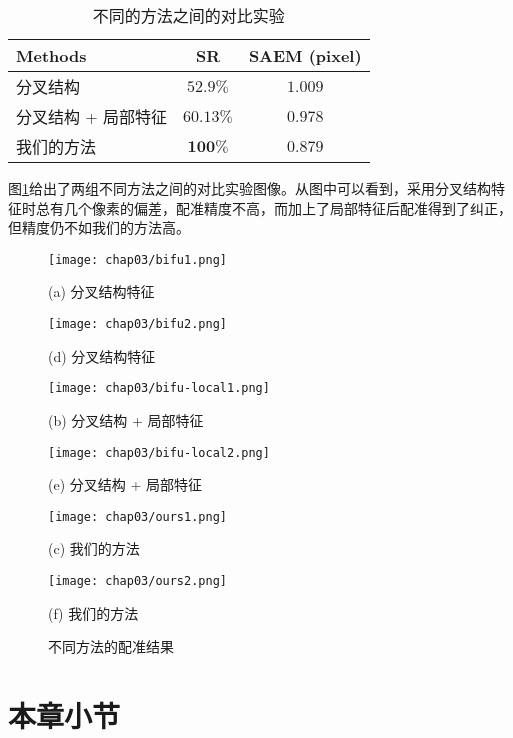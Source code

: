 \begin{table}[!ht]
\caption{不同的方法之间的对比实验}
\centering
\begin{tabular}{lcc}
\toprule
Methods & SR & SAEM (pixel)\\
\midrule
分叉结构 & $52.9\%$ & $1.009$\\
分叉结构 + 局部特征& $60.13\%$ & $0.978$\\
我们的方法 & $\mathbf{100\%}$ & $\mathbf{0.879}$\\
\bottomrule
\end{tabular}
\label{tab:methods}
\end{table}
图\ref{fig:methods-fig}给出了两组不同方法之间的对比实验图像。从图中可以看到，采用分叉结构特征时总有几个像素的偏差，配准精度不高，而加上了局部特征后配准得到了纠正，但精度仍不如我们的方法高。
\begin{figure}[!ht]
\centering
\begin{minipage}[b]{0.48\textwidth} 
      \centering 
      \texttt{[image: chap03/bifu1.png]}
        \centerline{(a) 分叉结构特征}\medskip
\end{minipage}
  \begin{minipage}[b]{0.48\textwidth}
    \centering
    \texttt{[image: chap03/bifu2.png]}
      \centerline{(d) 分叉结构特征}\medskip
  \end{minipage}
  \begin{minipage}[b]{0.48\textwidth}
    \centering
    \texttt{[image: chap03/bifu-local1.png]}
      \centerline{(b) 分叉结构 + 局部特征}\medskip
  \end{minipage}
 \begin{minipage}[b]{0.48\textwidth}
    \centering
      \texttt{[image: chap03/bifu-local2.png]}
        \centerline{(e) 分叉结构 + 局部特征}\medskip
    \end{minipage}
\begin{minipage}[b]{0.48\textwidth}
	\centering
      \texttt{[image: chap03/ours1.png]}
        \centerline{(c) 我们的方法}\medskip
    \end{minipage}
  \begin{minipage}[b]{0.48\textwidth}
    \centering
    \texttt{[image: chap03/ours2.png]}
      \centerline{(f) 我们的方法}\medskip
  \end{minipage}
\caption{不同方法的配准结果}
\label{fig:methods-fig}
\end{figure}

\section{本章小节}
\label{}

